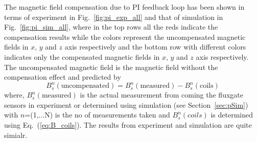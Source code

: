 The magnetic field compensation due to PI feedback loop has been shown in terms of experiment in Fig.~\ref{fig:pi_exp_all} and that of simulation in Fig.~\ref{fig:pi_sim_all}, where in the top rows all the reds indicate the compensation results while the colors represent the uncompensated magnetic fields in $x$, $y$ and $z$ axis respectively and the bottom row with different colors  indicates only the compensated magnetic fields in $x$, $y$ and $z$ axis respectively. The uncompensated magnetic field is the magnetic field without the compensation effect and predicted by
\begin{equation}\label{eq:Buncomp}
    B_s^n(\text{uncompensated})=B_s^n(\text{measured})- B_s^n(\text{coils})
\end{equation}
where, $B_s^n(\text{measured})$ is the actual measurement from coming the fluxgate sensors in experiment or determined using simulation (see Section~\ref{sec:pSim}) with $n$=(1,...N) is the no of measurements taken and $B_s^n(coils)$ is determined using Eq.~(\ref{eq:B_coils}). The results from experiment and simulation are quite simialr.

\FloatBarrier
{}

\FloatBarrier








